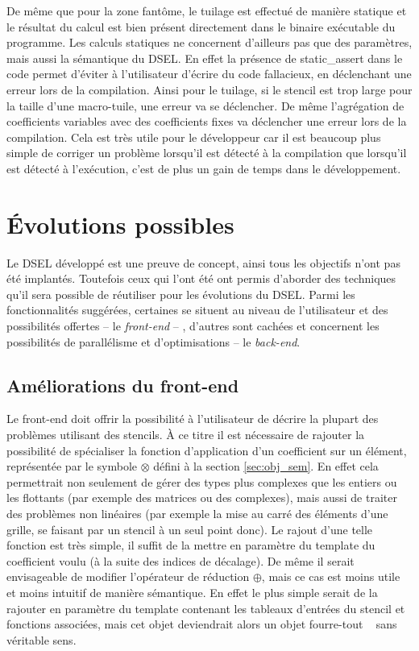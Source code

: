 De même que pour la zone fantôme, le tuilage est effectué de manière statique et le résultat du calcul est bien présent directement dans le binaire exécutable du programme. Les calculs statiques ne concernent d'ailleurs pas que des paramètres, mais aussi la sémantique du DSEL. En effet la présence de \textsf{static\_assert} dans le code permet d'éviter à l'utilisateur d'écrire du code fallacieux, en déclenchant une erreur lors de la compilation. Ainsi pour le tuilage, si le stencil est trop large pour la taille d'une macro-tuile, une erreur va se déclencher. De même l'agrégation de coefficients variables avec des coefficients fixes va déclencher une erreur lors de la compilation. Cela est très utile pour le développeur car il est beaucoup plus simple de corriger un problème lorsqu'il est détecté à la compilation que lorsqu'il est détecté à l'exécution, c'est de plus un gain de temps dans le développement. 


\section{\'Evolutions possibles}
\label{sec:evol_biblio}

Le DSEL développé est une preuve de concept, ainsi tous les objectifs n'ont pas été implantés. Toutefois ceux qui l'ont été ont permis d'aborder des techniques qu'il sera possible de réutiliser pour les évolutions du DSEL. Parmi les fonctionnalités suggérées, certaines se situent au niveau de l'utilisateur et des possibilités offertes -- le \emph{front-end} -- , d'autres sont cachées et concernent les possibilités de parallélisme et d'optimisations -- le \emph{back-end}.

\subsection{Améliorations du front-end}

Le front-end doit offrir la possibilité à l'utilisateur de décrire la plupart des problèmes utilisant des stencils. À ce titre il est nécessaire de rajouter la possibilité de spécialiser la fonction d'application d'un coefficient sur un élément, représentée par le symbole $\otimes$ défini à la section \ref{sec:obj_sem}. En effet cela permettrait non seulement de gérer des types plus complexes que les entiers ou les flottants (par exemple des matrices ou des complexes), mais aussi de traiter des problèmes non linéaires (par exemple la mise au carré des éléments d'une grille, se faisant par un stencil à un seul point donc). Le rajout d'une telle fonction est très simple, il suffit de la mettre en paramètre du template du coefficient voulu (à la suite des indices de décalage). De même il serait envisageable de modifier l'opérateur de réduction $\oplus$, mais ce cas est moins utile et moins intuitif de manière sémantique. En effet le plus simple serait de la rajouter en paramètre du template contenant les tableaux d'entrées du stencil et fonctions associées, mais cet objet deviendrait alors un objet \og fourre-tout \fg~ sans véritable sens. 

